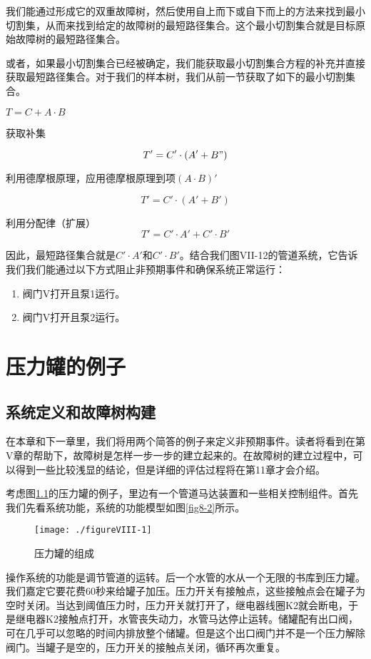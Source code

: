 \documentclass[cn,11pt,chinese]{elegantbook}
\begin{document}
{我们能通过形成它的双重故障树，然后使用自上而下或自下而上的方法来找到最小切割集，从而来找到给定的故障树的最短路径集合。这个最小切割集合就是目标原始故障树的最短路径集合。

或者，如果最小切割集合已经被确定，我们能获取最小切割集合方程的补充并直接获取最短路径集合。对于我们的样本树，我们从前一节获取了如下的最小切割集合。

$T=C+A\cdot B$

获取补集

$$T'=C'\cdot (A'+B")$$

利用德摩根原理，应用德摩根原理到项$(A\cdot B)'$

$$T'=C'\cdot (A'+B')$$

利用分配律（扩展）
$$T'=C'\cdot A'+C'\cdot B'$$

因此，最短路径集合就是$C'\cdot A'$和$C'\cdot B'$。结合我们图VII-12的管道系统，它告诉我们我们能通过以下方式阻止非预期事件和确保系统正常运行：

\begin{enumerate}
\item  阀门V打开且泵1运行。
\item  阀门V打开且泵2运行。
\end{enumerate}

\chapter{压力罐的例子}

\section{系统定义和故障树构建}

在本章和下一章里，我们将用两个简答的例子来定义非预期事件。读者将看到在第V章的帮助下，故障树是怎样一步一步的建立起来的。在故障树的建立过程中，可以得到一些比较浅显的结论，但是详细的评估过程将在第11章才会介绍。

考虑图\ref{fig8-1}的压力罐的例子，里边有一个管道马达装置和一些相关控制组件。首先我们先看系统功能，系统的功能模型如图\ref{fig8-2}所示。


\begin{figure}[h]
	\centering
	\texttt{[image: ./figureVIII-1]}
	\caption{压力罐的组成}
	\label{fig8-1}
\end{figure}

操作系统的功能是调节管道的运转。后一个水管的水从一个无限的书库到压力罐。我们嘉定它要花费60秒来给罐子加压。压力开关有接触点，这些接触点会在罐子为空时关闭。当达到阈值压力时，压力开关就打开了，继电器线圈K2就会断电，于是继电器K2接触点打开，水管丧失动力，水管马达停止运转。储罐配有出口阀，可在几乎可以忽略的时间内排放整个储罐。但是这个出口阀门并不是一个压力解除阀门。当罐子是空的，压力开关的接触点关闭，循环再次重复。

}
\end{document}
